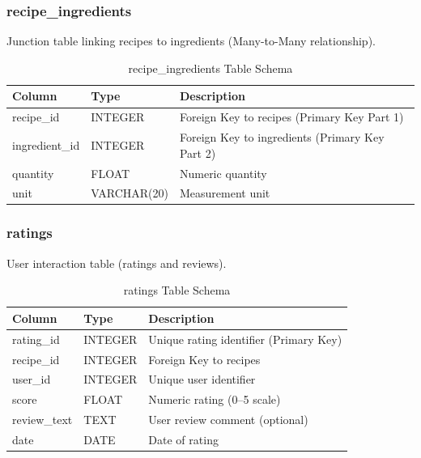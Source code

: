 \documentclass[11pt,a4paper]{article}
\begin{document}
\subsubsection{recipe\_ingredients}

Junction table linking recipes to ingredients (Many-to-Many relationship).

\begin{table}[H]
    \centering
    \begin{tabular}{|p{2.5cm}|p{2cm}|p{8cm}|}
        \hline
        \textbf{Column} & \textbf{Type} & \textbf{Description} \\
        \hline
        recipe\_id & INTEGER & Foreign Key to recipes (Primary Key Part 1) \\
        \hline
        ingredient\_id & INTEGER & Foreign Key to ingredients (Primary Key Part 2) \\
        \hline
        quantity & FLOAT & Numeric quantity \\
        \hline
        unit & VARCHAR(20) & Measurement unit \\
        \hline
    \end{tabular}
    \caption{recipe\_ingredients Table Schema}
    \label{tab:recipe_ingredients_schema}
\end{table}

\subsubsection{ratings}

User interaction table (ratings and reviews).

\begin{table}[H]
    \centering
    \begin{tabular}{|p{2.5cm}|p{2cm}|p{8cm}|}
        \hline
        \textbf{Column} & \textbf{Type} & \textbf{Description} \\
        \hline
        rating\_id & INTEGER & Unique rating identifier (Primary Key) \\
        \hline
        recipe\_id & INTEGER & Foreign Key to recipes \\
        \hline
        user\_id & INTEGER & Unique user identifier \\
        \hline
        score & FLOAT & Numeric rating (0--5 scale) \\
        \hline
        review\_text & TEXT & User review comment (optional) \\
        \hline
        date & DATE & Date of rating \\
        \hline
    \end{tabular}
    \caption{ratings Table Schema}
    \label{tab:ratings_schema}
\end{table}
\end{document}
